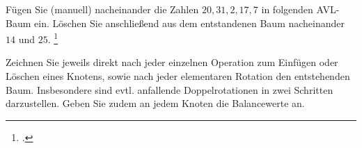 \documentclass{bschlangaul-aufgabe}
\begin{document}


Fügen Sie (manuell) nacheinander die Zahlen $20, 31, 2, 17, 7$ in
folgenden AVL-Baum ein. Löschen Sie anschließend aus dem entstandenen
Baum nacheinander $14$ und $25$.
\footcite{examen:66115:2019:09}

\begin{center}
\end{center}

\noindent
Zeichnen Sie jeweils direkt nach jeder einzelnen Operation zum Einfügen
oder Löschen eines Knotens, sowie nach jeder elementaren Rotation den
entstehenden Baum. Insbesondere sind evtl. anfallende Doppelrotationen
in zwei Schritten darzustellen. Geben Sie zudem an jedem Knoten die
Balancewerte an.
\end{document}
